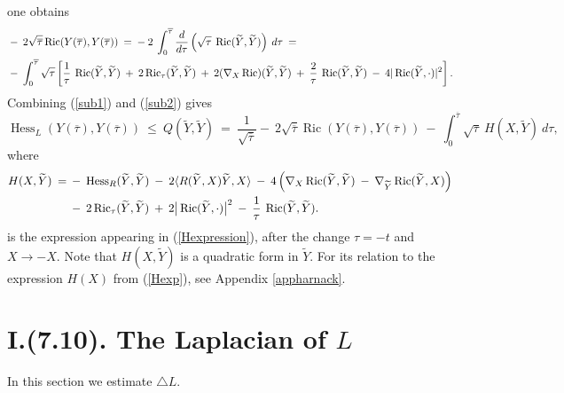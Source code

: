 \documentclass[12pt]{amsart}
\newcommand{\Hess}{\operatorname{Hess}}
\newcommand{\Ric}{\operatorname{Ric}}
\numberwithin{equation}{section}
\theoremstyle{plain}
\theoremstyle{definition}
\theoremstyle{remark}
\begin{document}
one obtains
\begin{align} \label{sub2}
& - \: 2 \sqrt{\overline{\tau}} \Ric({Y}({\overline{\tau}}), 
{Y}({\overline{\tau}})) \: = \: - \: 2 \:
\int_0^{\overline{\tau}} \frac{d}{d\tau} \left(
\sqrt{\tau} \: \Ric(\widetilde{Y}, \widetilde{Y}) \right) \: d\tau \: =  \\
& - \: \int_0^{\overline{\tau}} \sqrt{\tau} 
\left[ \frac{1}{\tau} \: \Ric(\widetilde{Y}, \widetilde{Y}) 
\: + \: 2 \Ric_\tau (\widetilde{Y}, \widetilde{Y})
\: + \: 2 (\nabla_X \Ric)(\widetilde{Y}, \widetilde{Y}) \: + \:
\frac{2}{\tau} \: \Ric(\widetilde{Y}, \widetilde{Y}) 
\: - \: 4 |\Ric(\widetilde{Y}, \cdot)|^2 \right]. \notag
\end{align}
Combining (\ref{sub1}) and (\ref{sub2}) gives
\begin{equation} \label{sub3}
\Hess_L(Y({\overline{\tau}}), Y({\overline{\tau}})) \: \le \: 
Q(\widetilde{Y}, \widetilde{Y}) \: = \: 
\frac{1}{\sqrt{\overline{\tau}}}
 - \: 2 \sqrt{\overline{\tau}} \Ric({Y}({\overline{\tau}}), 
{Y}({\overline{\tau}})) \: - \: \int_0^{\overline{\tau}}
\sqrt{\tau} \: H(X, \widetilde{Y}) \: d\tau,
\end{equation}
where
\begin{align} \label{Htilde}
H(X, \widetilde{Y}) \: = \: & - \: \Hess_R 
(\widetilde{Y},\widetilde{Y}) \: - \: 2 \langle 
R(\widetilde{Y}, X)\widetilde{Y}, X \rangle
\: -\: 4 \left( \nabla_X \Ric(\widetilde{Y}, \widetilde{Y}) 
\: - \: \nabla_{\widetilde{Y}} \Ric(\widetilde{Y}, X) \right) \\
&  - \: 2 \Ric_\tau(\widetilde{Y}, \widetilde{Y}) \: + \: 
2 \big| \Ric(\widetilde{Y}, \cdot) \big|^2
\: - \: \frac{1}{\tau} \: \Ric(\widetilde{Y}, \widetilde{Y}). \notag
\end{align}
is the expression appearing in 
(\ref{Hexpression}), after the change $\tau = - t$ and $X \rightarrow -X$.
Note that $H(X, \widetilde{Y})$ is a quadratic form in
$\widetilde{Y}$. For its relation to the expression
$H(X)$ from (\ref{Hexp}), see Appendix \ref{appharnack}.


\section{I.(7.10). The Laplacian of $L$} \label{7.10}

In this section we estimate $\triangle L$.
\end{document}

